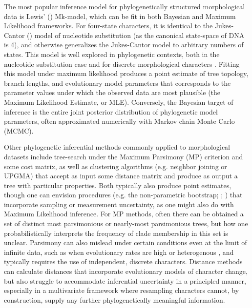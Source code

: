 \documentclass[10pt, twocolumn, twoside]{article}
\begin{document}
The most popular inference model for phylogenetically structured morphological data is Lewis’ (\citeyear{lewisLikelihoodApproachEstimating2001}) Mk-model, which can be fit in both Bayesian and Maximum Likelihood frameworks. For four-state characters, it is identical to the Jukes-Cantor (\citeyear{jukesEvolutionProteinMolecules1969}) model of nucleotide substitution (as the canonical state-space of DNA is 4), and otherwise generalizes the Jukes-Cantor model to arbitrary numbers of states. This model is well explored in phylogenetic contexts, both in the nucleotide substitution case and for discrete morphological characters \citep[e.g.][]{wrightModelingCharacterChange2016}. Fitting this model under maximum likelihood produces a point estimate of tree topology, branch lengths, and evolutionary model parameters that corresponds to the parameter values under which the observed data are most plausible (the Maximum Likelihood Estimate, or MLE). Conversely, the Bayesian target of inference is the entire joint posterior distribution of phylogenetic model parameters, often approximated numerically with Markov chain Monte Carlo (MCMC).

Other phylogenetic inferential methods commonly applied to morphological datasets include tree-search under the Maximum Parsimony (MP) criterion and some cost matrix, as well as clustering algorithms (e.g. neighbor joining or UPGMA) that accept as input some distance matrix and produce as output a tree with particular properties. Both typically also produce point estimates, though one can envision procedures (e.g. the non-parametric bootstrap; \citealt{efronBootstrapMethodsAnother1979}; \citealt{felsensteinConfidenceLimitsPhylogenies1985}) that incorporate sampling or measurement uncertainty, as one might also do with Maximum Likelihood inference. For MP methods, often there can be obtained a set of distinct most parsimonious or nearly-most parsimonious trees, but how one probabilistically interprets the frequency of clade membership in this set is unclear. Parsimony can also mislead under certain conditions even at the limit of infinite data, such as when evolutionary rates are high or heterogenous \citep{wrightBayesianAnalysisUsing2014, wrightModelingCharacterChange2016, oreillyProbabilisticMethodsSurpass2018}, and typically requires the use of independent, discrete characters. Distance methods can calculate distances that incorporate evolutionary models of character change, but also struggle to accommodate inferential uncertainty in a principled manner, especially in a multivariate framework where resampling characters cannot, by construction, supply any further phylogenetically meaningful information. 
\end{document}
